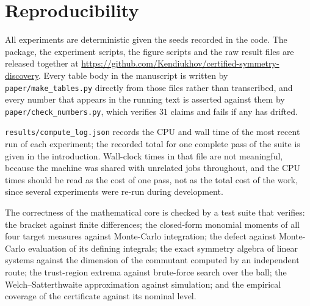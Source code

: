 \section{Reproducibility}
\label{app:repro}

All experiments are deterministic given the seeds recorded in the code. The
package, the experiment scripts, the figure scripts and the raw result files are
released together at
\url{https://github.com/Kendiukhov/certified-symmetry-discovery}. Every table body in the manuscript is written by
\texttt{paper/make\_tables.py} directly from those files rather than
transcribed, and every number that appears in the running text is asserted
against them by \texttt{paper/check\_numbers.py}, which verifies $31$ claims and
fails if any has drifted.

\texttt{results/compute\_log.json} records the CPU and wall time of the most
recent run of each experiment; the recorded total for one complete pass of the
suite is given in the introduction. Wall-clock times in that file are not
meaningful, because the machine was shared with unrelated jobs throughout, and the
CPU times should be read as the cost of one pass, not as the total cost of the
work, since several experiments were re-run during development.

The correctness of the mathematical core is checked by a test suite that
verifies: the bracket against finite differences; the closed-form monomial
moments of all four target measures against Monte-Carlo integration; the defect
against Monte-Carlo evaluation of its defining integrals; the exact symmetry
algebra of linear systems against the dimension of the commutant computed by an
independent route; the trust-region extrema against brute-force search over the
ball; the Welch--Satterthwaite approximation against simulation; and the
empirical coverage of the certificate against its nominal level.
